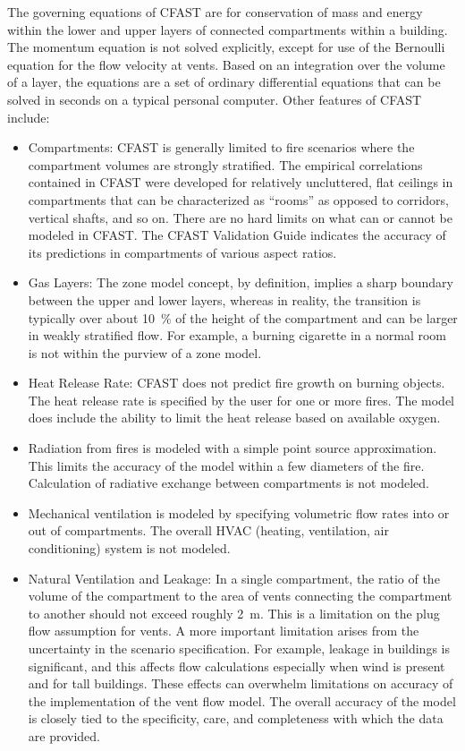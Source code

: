 The governing equations of CFAST are for conservation of mass and energy within the lower and upper layers of connected compartments within a building. The momentum equation is not solved explicitly, except for use of the Bernoulli equation for the flow velocity at vents. Based on an integration over the volume of a layer, the equations are a set of ordinary differential equations that can be solved in seconds on a typical personal computer. Other features of CFAST include:
\begin{itemize}
\item Compartments: CFAST is generally limited to fire scenarios where the compartment volumes are strongly stratified. The empirical correlations contained in CFAST were developed for relatively uncluttered, flat ceilings in compartments that can be characterized as ``rooms'' as opposed to corridors, vertical shafts, and so on. There are no hard limits on what can or cannot be modeled in CFAST. The CFAST Validation Guide indicates the accuracy of its predictions in compartments of various aspect ratios.
\item Gas Layers:  The zone model concept, by definition, implies a sharp boundary between the upper and lower layers, whereas in reality, the transition is typically over about 10~\% of the height of the compartment and can be larger in weakly stratified flow.  For example, a burning cigarette in a normal room is not within the purview of a zone model.
\item Heat Release Rate: CFAST does not predict fire growth on burning objects. The heat release rate is specified by the user for one or more fires. The model does include the ability to limit the heat release based on available oxygen.
\item Radiation from fires is modeled with a simple point source approximation.  This limits the accuracy of the model within a few diameters of the fire. Calculation of radiative exchange between compartments is not modeled.
\item Mechanical ventilation is modeled by specifying volumetric flow rates into or out of compartments. The overall HVAC (heating, ventilation, air conditioning) system is not modeled.
\item Natural Ventilation and Leakage:  In a single compartment, the ratio of the volume of the compartment to the area of vents connecting the compartment to another should not exceed roughly 2~m.  This is a limitation on the plug flow assumption for vents.  A more important limitation arises from the uncertainty in the scenario specification.  For example, leakage in buildings is significant, and this affects flow calculations especially when wind is present and for tall buildings.  These effects can overwhelm limitations on accuracy of the implementation of the vent flow model.  The overall accuracy of the model is closely tied to the specificity, care, and completeness with which the data are provided.

\end{itemize}
